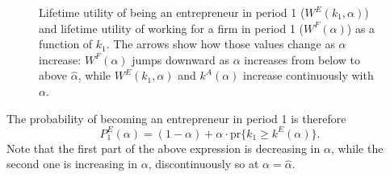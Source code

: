 \documentclass[12pt,american]{paper}
\theoremstyle{remark}
\begin{document}
\begin{figure} 
 \centering



\caption{\footnotesize Lifetime utility of being an entrepreneur in period 1 ($W^E(k_1,\alpha)$) and lifetime utility of working for a firm in period 1 ($W^F(\alpha)$) as a function of  $k_1$. The arrows show how those values change as $\alpha$ increase: $W^F(\alpha)$ jumps downward as $\alpha$ increases from below to above $\hat \alpha$, while  $W^E(k_1,\alpha)$ and $k^A(\alpha)$ increase continuously with $\alpha$. } 
\label{fig:effect-labor}
\end{figure}


 The probability of becoming an entrepreneur in period 1 is therefore
 \[
 P^E_1(\alpha) = (1-\alpha) + \alpha \cdot \mbox{pr}\{k_1 \geq k^E (\alpha) \}.
 \]
 Note that the first part of the above expression is decreasing in $\alpha$, while the second one is increasing in $\alpha$, discontinuously so at $\alpha=\hat \alpha$.
 
\end{document}
